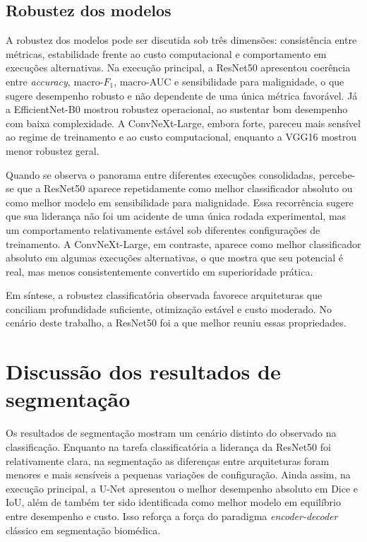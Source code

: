 \documentclass[tcc,capa]{texufpel}
\begin{document}
\subsection{Robustez dos modelos}

A robustez dos modelos pode ser discutida sob três dimensões: consistência entre métricas, estabilidade frente ao custo computacional e comportamento em execuções alternativas. Na execução principal, a ResNet50 apresentou coerência entre \textit{accuracy}, macro-\(F_1\), macro-AUC e sensibilidade para malignidade, o que sugere desempenho robusto e não dependente de uma única métrica favorável. Já a EfficientNet-B0 mostrou robustez operacional, ao sustentar bom desempenho com baixa complexidade. A ConvNeXt-Large, embora forte, pareceu mais sensível ao regime de treinamento e ao custo computacional, enquanto a VGG16 mostrou menor robustez geral.

Quando se observa o panorama entre diferentes execuções consolidadas, percebe-se que a ResNet50 aparece repetidamente como melhor classificador absoluto ou como melhor modelo em sensibilidade para malignidade. Essa recorrência sugere que sua liderança não foi um acidente de uma única rodada experimental, mas um comportamento relativamente estável sob diferentes configurações de treinamento. A ConvNeXt-Large, em contraste, aparece como melhor classificador absoluto em algumas execuções alternativas, o que mostra que seu potencial é real, mas menos consistentemente convertido em superioridade prática.

Em síntese, a robustez classificatória observada favorece arquiteturas que conciliam profundidade suficiente, otimização estável e custo moderado. No cenário deste trabalho, a ResNet50 foi a que melhor reuniu essas propriedades.

\section{Discussão dos resultados de segmentação}

Os resultados de segmentação mostram um cenário distinto do observado na classificação. Enquanto na tarefa classificatória a liderança da ResNet50 foi relativamente clara, na segmentação as diferenças entre arquiteturas foram menores e mais sensíveis a pequenas variações de configuração. Ainda assim, na execução principal, a U-Net apresentou o melhor desempenho absoluto em Dice e IoU, além de também ter sido identificada como melhor modelo em equilíbrio entre desempenho e custo. Isso reforça a força do paradigma \textit{encoder-decoder} clássico em segmentação biomédica.
\end{document}
